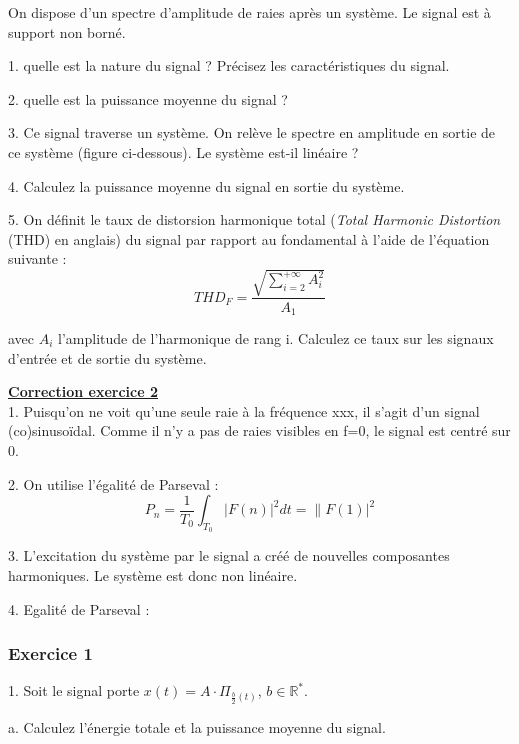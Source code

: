 \documentclass[11pt]{report}
\begin{document}
	On dispose d'un spectre d'amplitude de raies après un système. Le signal est à support non borné.
	
	1. quelle est la nature du signal ? Précisez les caractéristiques du signal.
	
	2. quelle est la puissance moyenne du signal ?
	
	3. Ce signal traverse un système. On relève le spectre en amplitude en sortie de ce système (figure ci-dessous). Le système est-il linéaire ?
	
	4. Calculez la puissance moyenne du signal en sortie du système.
	
	5. On définit le taux de distorsion harmonique total (\textit{Total Harmonic Distortion} (THD) en anglais) du signal par rapport au fondamental à l'aide de l'équation suivante :
	\begin{equation*}
	THD_{F}=\frac{\sqrt{\sum_{i=2}^{+\infty}A_{i}^{2}}}{A_{1}}
	\end{equation*}
	
	 avec  $A_{i}$ l'amplitude de l'harmonique de rang i. Calculez ce taux sur les signaux d'entrée et de sortie du système.
	
	\vspace{1\baselineskip}
	
	\textbf{\underline{Correction exercice 2}}\\
	
	1. Puisqu'on ne voit qu'une seule raie à la fréquence xxx, il s'agit d'un signal (co)sinusoïdal. Comme il n'y a pas de raies visibles en f=0, le signal est centré sur 0.
	
	2. On utilise l'égalité de Parseval :
	\begin{equation*}
	P_{n}=\frac{1}{T_{0}}\int_{T_{0}}|F(n)|^{2}dt=\|F(1)|^{2}
	\end{equation*}
	
	3. L'excitation du système par le signal a créé de nouvelles composantes harmoniques. Le système est donc non linéaire.
	
	4. Egalité de Parseval :
	
	
	\subsubsection{Exercice 1}
	
	1. Soit le signal porte $x(t)=A\cdot \Pi_{\frac{b}{2}(t)}$, $b\in \mathbb{R^{*}}$.
	
		a. Calculez l'énergie totale et la puissance moyenne du signal.
		
\end{document}
